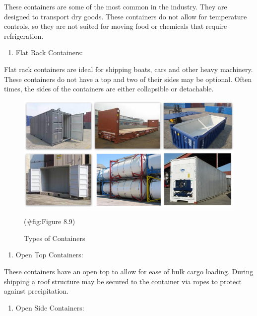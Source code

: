 \documentclass[
]{book}
\providecommand{\tightlist}{%
  \setlength{\itemsep}{0pt}\setlength{\parskip}{0pt}}
\begin{document}
These containers are some of the most common in the industry. They are designed to transport dry goods. These containers do not allow for temperature controls, so they are not suited for moving food or chemicals that require refrigeration.

\begin{enumerate}
\def\labelenumi{\arabic{enumi}.}
\setcounter{enumi}{1}
\tightlist
\item
  Flat Rack Containers:
\end{enumerate}

Flat rack containers are ideal for shipping boats, cars and other heavy machinery. These containers do not have a top and two of their sides may be optional. Often times, the sides of the containers are either collapsible or detachable.

\begin{figure}

{\centering \includegraphics{./Images/seaport operation/Types of Containers} 

}

\caption{Types of Containers}(\#fig:Figure 8.9)
\end{figure}

\begin{enumerate}
\def\labelenumi{\arabic{enumi}.}
\setcounter{enumi}{2}
\tightlist
\item
  Open Top Containers:
\end{enumerate}

These containers have an open top to allow for ease of bulk cargo loading. During shipping a roof structure may be secured to the container via ropes to protect against precipitation.

\begin{enumerate}
\def\labelenumi{\arabic{enumi}.}
\setcounter{enumi}{3}
\tightlist
\item
  Open Side Containers:
\end{enumerate}
\end{document}

